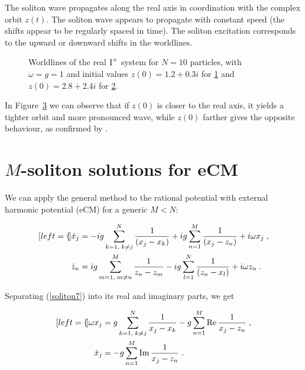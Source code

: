The soliton wave propagates along the real axis in coordination with the complex orbit $z(t)$. The soliton wave appears to propagate with constant speed (the shifts appear to be regularly spaced in time). The soliton excitation corresponds to the upward or downward shifts in the worldlines.  

\begin{figure}[H]
\centering
\begin{subfigure}{.49\textwidth}
  \centering
  \caption{}
  \label{fig:sub1}
\end{subfigure}%
\begin{subfigure}{.49\textwidth}
  \centering
  \caption{}
  \label{fig:sub2}
\end{subfigure}
\caption{Worldlines of the real $\textnormal{I}^+$ system for $N = 10$ particles, with $\omega = g = 1$ and initial values $z(0) = 1.2 + 0.3i$ for \ref{fig:sub1} and $z(0) = 2.8 + 2.4i$ for \ref{fig:sub2}.}
\label{fig:test}
\end{figure}

In Figure~\ref{fig:test} we can observe that if $z(0)$ is closer to the real axis, it yields a tighter orbit and more pronounced wave, while $z(0)$ farther gives the opposite behaviour, as confirmed by \cite{philip2019soliton}.

\section{$M$-soliton solutions for eCM}
We can apply the general method to the rational potential with external harmonic potential (eCM) for a generic $M < N$:

\begin{subequations}
\begin{align}[left=\empheqlbrace]
\dot x_j &= -ig \sum_{k=1,\;k \neq j}^N \frac{1}{(x_j - x_k)} + ig \sum_{n = 1}^M \frac{1}{(x_j - z_n)} + i\omega x_j \label{soliton7}\;,\\
\dot z_n &= ig \sum_{m=1,\;m\neq n}^M \frac{1}{z_n - z_m} - ig \sum_{l=1}^N \frac{1}{(z_n - x_l)} + i\omega z_n\;.
\end{align}
\end{subequations}

Separating (\ref{soliton7}) into its real and imaginary parts, we get

\begin{subequations}
\begin{align}[left=\empheqlbrace]
    \omega x_j &= g\sum_{k=1,\;k \neq j}^N \frac{1}{x_j - x_k} - g \sum_{n=1}^M\operatorname{Re}{\frac{1}{x_j - z_n}} \label{soliton8}\;, \\
    \dot x_j &= - g \sum_{n=1}^M\operatorname{Im}{\frac{1}{x_j - z_n}} \label{soliton9}\;.
\end{align}
\end{subequations}

